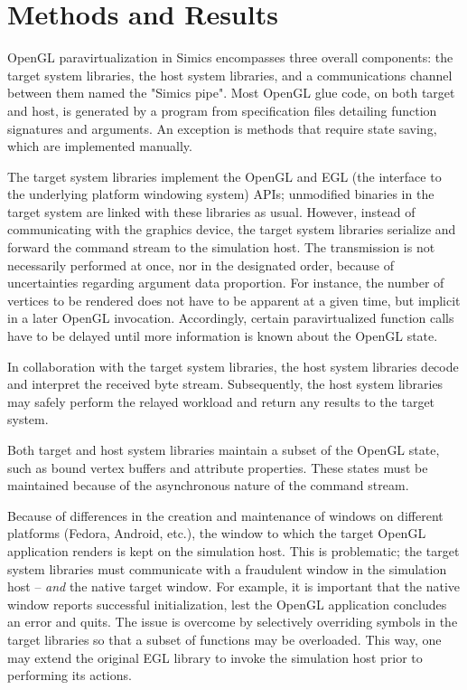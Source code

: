 \section{Methods and Results}
\label{sec:methodsandresults}
OpenGL paravirtualization in Simics encompasses three overall components: the target system libraries, the host system libraries, and a communications channel between them named the "Simics pipe".
Most OpenGL glue code, on both target and host, is generated by a program from specification files detailing function signatures and arguments.
An exception is methods that require state saving, which are implemented manually.

The target system libraries implement the OpenGL and EGL (the interface to the underlying platform windowing system) APIs; unmodified binaries in the target system are linked with these libraries as usual.
However, instead of communicating with the graphics device, the target system libraries serialize and forward the command stream to the simulation host.
The transmission is not necessarily performed at once, nor in the designated order, because of uncertainties regarding argument data proportion.
For instance, the number of vertices to be rendered does not have to be apparent at a given time, but implicit in a later OpenGL invocation.
Accordingly, certain paravirtualized function calls have to be delayed until more information is known about the OpenGL state.

In collaboration with the target system libraries, the host system libraries decode and interpret the received byte stream.
Subsequently, the host system libraries may safely perform the relayed workload and return any results to the target system.

Both target and host system libraries maintain a subset of the OpenGL state, such as bound vertex buffers and attribute properties.
These states must be maintained because of the asynchronous nature of the command stream.

Because of differences in the creation and maintenance of windows on different platforms (Fedora, Android, etc.), the window to which the target OpenGL application renders is kept on the simulation host.
This is problematic; the target system libraries must communicate with a fraudulent window in the simulation host -- \textit{and} the native target window.
For example, it is important that the native window reports successful initialization, lest the OpenGL application concludes an error and quits.
The issue is overcome by selectively overriding symbols in the target libraries so that a subset of functions may be overloaded.
This way, one may extend the original EGL library to invoke the simulation host prior to performing its actions.

